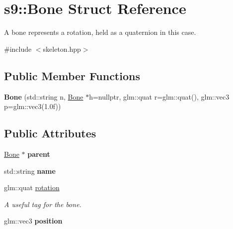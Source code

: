 \hypertarget{structs9_1_1Bone}{\section{s9\-:\-:Bone Struct Reference}
\label{structs9_1_1Bone}
}


A bone represents a rotation, held as a quaternion in this case.  




{\ttfamily \#include $<$skeleton.\-hpp$>$}

\subsection*{Public Member Functions}
\begin{DoxyCompactItemize}
\item 
\hypertarget{structs9_1_1Bone_aaaee494881f8a25a0d845cb48d67b13a}{{\bfseries Bone} (std\-::string n, \hyperlink{structs9_1_1Bone}{Bone} $\ast$h=nullptr, glm\-::quat r=glm\-::quat(), glm\-::vec3 p=glm\-::vec3(1.\-0f))}\label{structs9_1_1Bone_aaaee494881f8a25a0d845cb48d67b13a}

\end{DoxyCompactItemize}
\subsection*{Public Attributes}
\begin{DoxyCompactItemize}
\item 
\hypertarget{structs9_1_1Bone_a01e2010159e1d3af4a9315898e318e76}{\hyperlink{structs9_1_1Bone}{Bone} $\ast$ {\bfseries parent}}\label{structs9_1_1Bone_a01e2010159e1d3af4a9315898e318e76}

\item 
\hypertarget{structs9_1_1Bone_a5838abd031bad26babff1e1a24fe3c7c}{std\-::string {\bfseries name}}\label{structs9_1_1Bone_a5838abd031bad26babff1e1a24fe3c7c}

\item 
\hypertarget{structs9_1_1Bone_af365d3f5aba85ce88ba4f99cfe282c6a}{glm\-::quat \hyperlink{structs9_1_1Bone_af365d3f5aba85ce88ba4f99cfe282c6a}{rotation}}\label{structs9_1_1Bone_af365d3f5aba85ce88ba4f99cfe282c6a}

\begin{DoxyCompactList}\small\item\em A useful tag for the bone. \end{DoxyCompactList}\item 
\hypertarget{structs9_1_1Bone_a32491f9f9cd0f88b8df8d06514394926}{glm\-::vec3 {\bfseries position}}\label{structs9_1_1Bone_a32491f9f9cd0f88b8df8d06514394926}

\end{DoxyCompactItemize}
